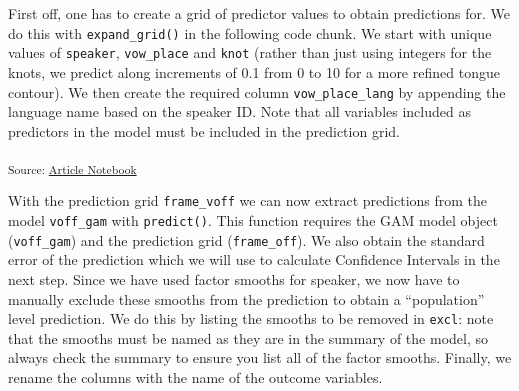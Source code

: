 \documentclass[
]{interact}
\newenvironment{Shaded}{\begin{snugshade}}{\end{snugshade}}
\newcommand{\AttributeTok}[1]{\textcolor[rgb]{0.40,0.45,0.13}{#1}}
\newcommand{\CommentTok}[1]{\textcolor[rgb]{0.37,0.37,0.37}{#1}}
\newcommand{\DecValTok}[1]{\textcolor[rgb]{0.68,0.00,0.00}{#1}}
\newcommand{\FloatTok}[1]{\textcolor[rgb]{0.68,0.00,0.00}{#1}}
\newcommand{\FunctionTok}[1]{\textcolor[rgb]{0.28,0.35,0.67}{#1}}
\newcommand{\NormalTok}[1]{\textcolor[rgb]{0.00,0.23,0.31}{#1}}
\newcommand{\OtherTok}[1]{\textcolor[rgb]{0.00,0.23,0.31}{#1}}
\newcommand{\SpecialCharTok}[1]{\textcolor[rgb]{0.37,0.37,0.37}{#1}}
\newcommand{\StringTok}[1]{\textcolor[rgb]{0.13,0.47,0.30}{#1}}
\begin{document}
First off, one has to create a grid of predictor values to obtain
predictions for. We do this with \texttt{expand\_grid()} in the
following code chunk. We start with unique values of \texttt{speaker},
\texttt{vow\_place} and \texttt{knot} (rather than just using integers
for the knots, we predict along increments of 0.1 from 0 to 10 for a
more refined tongue contour). We then create the required column
\texttt{vow\_place\_lang} by appending the language name based on the
speaker ID. Note that all variables included as predictors in the model
must be included in the prediction grid.

\begin{Shaded}
\end{Shaded}

\textsubscript{Source:
\href{https://stefanocoretta.github.io/mv_uti/index.qmd.html}{Article
Notebook}}

With the prediction grid \texttt{frame\_voff} we can now extract
predictions from the model \texttt{voff\_gam} with \texttt{predict()}.
This function requires the GAM model object (\texttt{voff\_gam}) and the
prediction grid (\texttt{frame\_off}). We also obtain the standard error
of the prediction which we will use to calculate Confidence Intervals in
the next step. Since we have used factor smooths for speaker, we now
have to manually exclude these smooths from the prediction to obtain a
``population'' level prediction. We do this by listing the smooths to be
removed in \texttt{excl}: note that the smooths must be named as they
are in the summary of the model, so always check the summary to ensure
you list all of the factor smooths. Finally, we rename the columns with
the name of the outcome variables.
\end{document}
